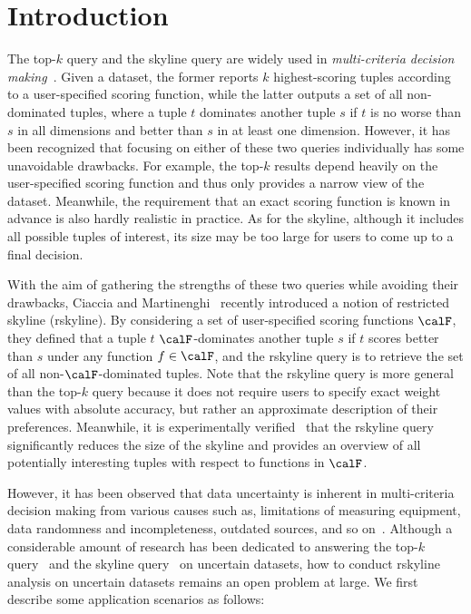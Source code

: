 \section{Introduction}\label{sec:introduction}
The top-$k$ query and the skyline query are widely used in \textit{multi-criteria decision making}~\cite{koksalan2011multiple}.
Given a dataset, the former reports $k$ highest-scoring tuples according to a user-specified scoring function, while the latter outputs a set of all non-dominated tuples, where a tuple $t$ dominates another tuple $s$ if $t$ is no worse than $s$ in all dimensions and better than $s$ in at least one dimension.
However, it has been recognized that focusing on either of these two queries individually has some unavoidable drawbacks.
For example, the top-$k$ results depend heavily on the user-specified scoring function and thus only provides a narrow view of the dataset.
Meanwhile, the requirement that an exact scoring function is known in advance is also hardly realistic in practice.
As for the skyline, although it includes all possible tuples of interest, its size may be too large for users to come up to a final decision.

With the aim of gathering the strengths of these two queries while avoiding their drawbacks,  Ciaccia and Martinenghi~\cite{DBLP:journals/pvldb/CiacciaM17} recently introduced a notion of restricted skyline (rskyline).
By considering a set of user-specified scoring functions $\calF$, they defined that a tuple $t$ $\calF$-dominates another tuple $s$ if $t$ scores better than $s$ under any function $f \in \calF$, and the rskyline query is to retrieve the set of all non-$\calF$-dominated tuples.
Note that the rskyline query is more general than the top-$k$ query because it does not require users to specify exact weight values with absolute accuracy, but rather an approximate description of their preferences.
Meanwhile, it is experimentally verified~\cite{DBLP:journals/pvldb/CiacciaM17} that the rskyline query significantly reduces the size of the skyline and provides an overview of all potentially interesting tuples with respect to functions in $\calF$.

However, it has been observed that data uncertainty is inherent in multi-criteria decision making from various causes such as, limitations of measuring equipment, data randomness and incompleteness, outdated sources, and so on~\cite{DBLP:journals/fcsc/LiWLG20}.
Although a considerable amount of research has been dedicated to answering the top-$k$ query~\cite{DBLP:conf/icde/SolimanIC07, DBLP:conf/icde/YiLKS08, DBLP:conf/icde/HuaPZL08, DBLP:journals/dpd/WangSY16} and the skyline query~\cite{DBLP:conf/vldb/PeiJLY07, DBLP:conf/pods/AtallahQ09, DBLP:journals/tods/AtallahQY11, DBLP:journals/mst/AfshaniAALP13, DBLP:journals/tkde/KimIP12, DBLP:journals/tjs/Gavagsaz21, DBLP:conf/icdcs/ZhangWWH19, DBLP:journals/is/ZhangZLJP11} on uncertain datasets, how to conduct rskyline analysis on uncertain datasets remains an open problem at large.
We first describe some application scenarios as follows:

